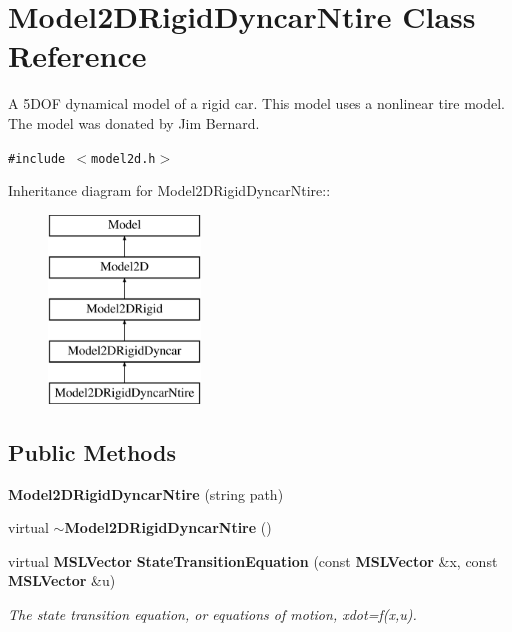 \section{Model2DRigid\-Dyncar\-Ntire  Class Reference}
\label{class_Model2DRigidDyncarNtire}
A 5DOF dynamical model of a rigid car. This model uses a nonlinear tire model. The model was donated by Jim Bernard. 


{\tt \#include $<$model2d.h$>$}

Inheritance diagram for Model2DRigid\-Dyncar\-Ntire::\begin{figure}[H]
\begin{center}
\leavevmode
\includegraphics[height=5cm]{class_Model2DRigidDyncarNtire}
\end{center}
\end{figure}
\subsection*{Public Methods}
\begin{CompactItemize}
\item 
{\bf Model2DRigid\-Dyncar\-Ntire} (string path)
\item 
virtual {\bf $\sim$Model2DRigid\-Dyncar\-Ntire} ()
\item 
virtual {\bf MSLVector} {\bf State\-Transition\-Equation} (const {\bf MSLVector} \&x, const {\bf MSLVector} \&u)
\begin{CompactList}\small\item\em The state transition equation, or equations of motion, xdot=f(x,u).\item\end{CompactList}\end{CompactItemize}
